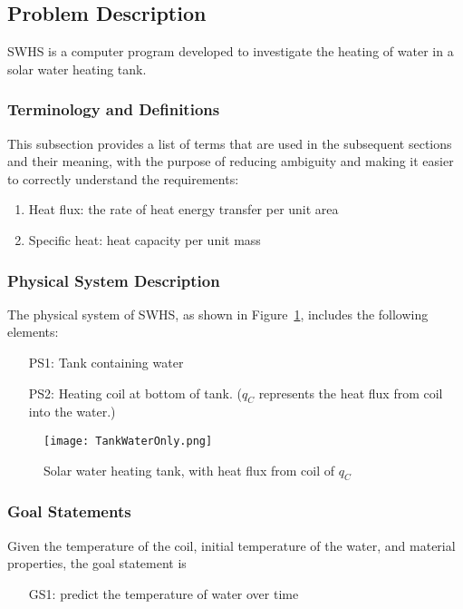 \documentclass[12pt]{article}
\begin{document}
\subsection{Problem Description}
\label{Sec:ProbDesc}
SWHS is a computer program developed to investigate the heating of water in a solar water heating tank.
\subsubsection{Terminology and Definitions}
\label{Sec:TermandDefi}
This subsection provides a list of terms that are used in the subsequent sections and their meaning, with the purpose of reducing ambiguity and making it easier to correctly understand the requirements:
\begin{enumerate}
\item{Heat flux: the rate of heat energy transfer per unit area}
\item{Specific heat: heat capacity per unit mass}
\end{enumerate}
\subsubsection{Physical System Description}
\label{Sec:PhysSystDesc}
The physical system of SWHS, as shown in Figure~\ref{Figure:Solawateheattankwithheatfluxfromcoilof}, includes the following elements:
\begin{itemize}
\item[PS1:]Tank containing water
\item[PS2:]Heating coil at bottom of tank. ($q_{C}$ represents the heat flux from coil into the water.)
\end{itemize}
\begin{figure}
\begin{center}
\texttt{[image: TankWaterOnly.png]}
\caption{Solar water heating tank, with heat flux from coil of $q_{C}$}
\label{Figure:Solawateheattankwithheatfluxfromcoilof}
\end{center}
\end{figure}
\subsubsection{Goal Statements}
\label{Sec:GoalStat}
Given the temperature of the coil, initial temperature of the water, and material properties, the goal statement is
\begin{itemize}
\item[GS1:]predict the temperature of water over time
\end{itemize}
\end{document}
